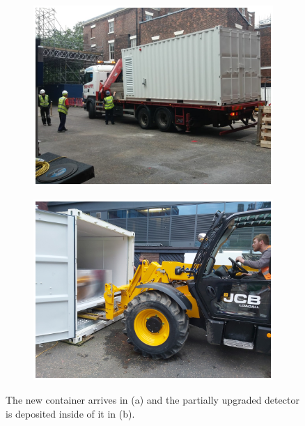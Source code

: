 \begin{figure}[!h]
\centering
\begin{subfigure}{.5\textwidth}
  \centering
  \includegraphics[width=\linewidth]{Chapter3/Figs/Raster/detCon037c_ContainerArrives.png}
  \captionsetup{width=.9\linewidth}
  \caption{}
  \label{subFig:detCon037c_ContainerArrives}
\end{subfigure}%
\begin{subfigure}{.5\textwidth}
  \centering
  \includegraphics[width=\linewidth]{Chapter3/Figs/Raster/detCon039b_PutIn2.png}
  \captionsetup{width=.9\linewidth}
  \caption{}
  \label{subFig:detCon039b_PutIn2}
\end{subfigure}
\caption[The detector is deposited inside the new container.]{The new container arrives in (a) and the partially upgraded detector is deposited inside of it in (b).}
\label{fig:detCon_ContainerArrives_PutIn}
\end{figure}

